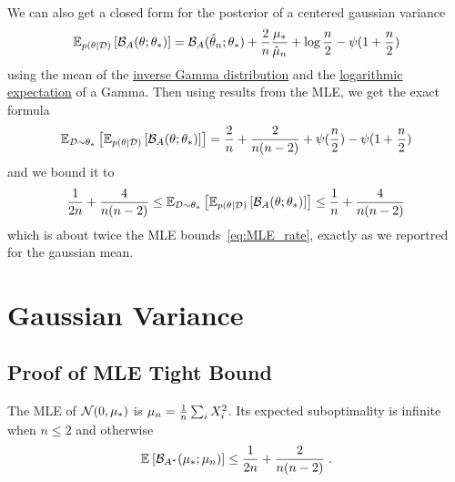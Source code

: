 \documentclass{article}
\newcommand*{\expect}[2][]{\ensuremath{\mathbb{E}_{#1} \left[ #2 \right] }} %
\newcommand{\logpart}{A}
\newcommand{\bregman}{\cB_\logpart}
\newcommand{\bregmanconj}{\cB_{\logpart^*}}
\newcommand{\natp}{\theta}
\begin{document}
\begin{example}
	We can also get a closed form for the posterior of a centered gaussian variance 
	\begin{align}
		\expect[p(\natp|\cD)]{\bregman(\natp ; \natp_*)} = \bregman(\hat \natp_n ; \natp_*) + \frac{2}{n} \frac{\mu_*}{\hat \mu_n} + \log\frac{n}{2} - \psi(1 + \frac{n}{2})
	\end{align}
	using the mean of the \href{https://en.wikipedia.org/wiki/Inverse-gamma_distribution}{inverse Gamma distribution} and the \href{https://en.wikipedia.org/wiki/Gamma_distribution#Logarithmic_expectation_and_variance}{logarithmic expectation} of a Gamma. 
	Then using results from the MLE, we get the exact formula
	\begin{align}
		\expect[\cD\sim\natp_*]{\expect[p(\natp|\cD)]{\bregman(\natp ; \natp_*)}}
		= \frac{2}{n} + \frac{2}{n(n-2)} + \psi(\half[n]) - \psi(1+ \half[n])
	\end{align}
	and we bound it to 
	\begin{align}
		\inv{2n} + \frac{4}{n(n-2)}
		\leq \expect[\cD\sim\natp_*]{\expect[p(\natp|\cD)]{\bregman(\natp ; \natp_*)}}
		\leq 
		\inv{n} + \frac{4}{n(n-2)}
	\end{align}
	which is about twice the MLE bounds~\eqref{eq:MLE_rate}, exactly as we reportred for the gaussian mean.
\end{example}


\section{Gaussian Variance}
\subsection{Proof of MLE Tight Bound}
	\begin{theorem}
	The MLE of ${\mathcal N}(0,\mu_*)$ is $\mu_n = \frac{1}{n} \sum_i X_i^2 $.
	Its expected suboptimality is infinite when $n\leq 2$ and otherwise
	\begin{align}
		 \expect{\bregmanconj( \mu_*; \mu_n) }
			\leq \inv{2n} +\frac{2}{n(n-2)} \; .
	\end{align}
	\end{theorem}
	
\end{document}
